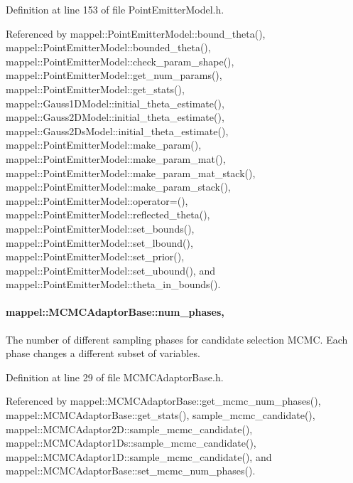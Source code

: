 Definition at line 153 of file Point\+Emitter\+Model.\+h.



Referenced by mappel\+::\+Point\+Emitter\+Model\+::bound\+\_\+theta(), mappel\+::\+Point\+Emitter\+Model\+::bounded\+\_\+theta(), mappel\+::\+Point\+Emitter\+Model\+::check\+\_\+param\+\_\+shape(), mappel\+::\+Point\+Emitter\+Model\+::get\+\_\+num\+\_\+params(), mappel\+::\+Point\+Emitter\+Model\+::get\+\_\+stats(), mappel\+::\+Gauss1\+D\+Model\+::initial\+\_\+theta\+\_\+estimate(), mappel\+::\+Gauss2\+D\+Model\+::initial\+\_\+theta\+\_\+estimate(), mappel\+::\+Gauss2\+Ds\+Model\+::initial\+\_\+theta\+\_\+estimate(), mappel\+::\+Point\+Emitter\+Model\+::make\+\_\+param(), mappel\+::\+Point\+Emitter\+Model\+::make\+\_\+param\+\_\+mat(), mappel\+::\+Point\+Emitter\+Model\+::make\+\_\+param\+\_\+mat\+\_\+stack(), mappel\+::\+Point\+Emitter\+Model\+::make\+\_\+param\+\_\+stack(), mappel\+::\+Point\+Emitter\+Model\+::operator=(), mappel\+::\+Point\+Emitter\+Model\+::reflected\+\_\+theta(), mappel\+::\+Point\+Emitter\+Model\+::set\+\_\+bounds(), mappel\+::\+Point\+Emitter\+Model\+::set\+\_\+lbound(), mappel\+::\+Point\+Emitter\+Model\+::set\+\_\+prior(), mappel\+::\+Point\+Emitter\+Model\+::set\+\_\+ubound(), and mappel\+::\+Point\+Emitter\+Model\+::theta\+\_\+in\+\_\+bounds().

\paragraph[{\texorpdfstring{num\+\_\+phases}{num_phases}}]{ mappel\+::\+M\+C\+M\+C\+Adaptor\+Base\+::num\+\_\+phases\hspace{0.3cm}{\ttfamily [protected]}, {\ttfamily [inherited]}}\hypertarget{classmappel_1_1MCMCAdaptorBase_a44b90a984ace712584074dc17831fe25}{}\label{classmappel_1_1MCMCAdaptorBase_a44b90a984ace712584074dc17831fe25}
The number of different sampling phases for candidate selection M\+C\+MC. Each phase changes a different subset of variables. 

Definition at line 29 of file M\+C\+M\+C\+Adaptor\+Base.\+h.



Referenced by mappel\+::\+M\+C\+M\+C\+Adaptor\+Base\+::get\+\_\+mcmc\+\_\+num\+\_\+phases(), mappel\+::\+M\+C\+M\+C\+Adaptor\+Base\+::get\+\_\+stats(), sample\+\_\+mcmc\+\_\+candidate(), mappel\+::\+M\+C\+M\+C\+Adaptor2\+D\+::sample\+\_\+mcmc\+\_\+candidate(), mappel\+::\+M\+C\+M\+C\+Adaptor1\+Ds\+::sample\+\_\+mcmc\+\_\+candidate(), mappel\+::\+M\+C\+M\+C\+Adaptor1\+D\+::sample\+\_\+mcmc\+\_\+candidate(), and mappel\+::\+M\+C\+M\+C\+Adaptor\+Base\+::set\+\_\+mcmc\+\_\+num\+\_\+phases().


